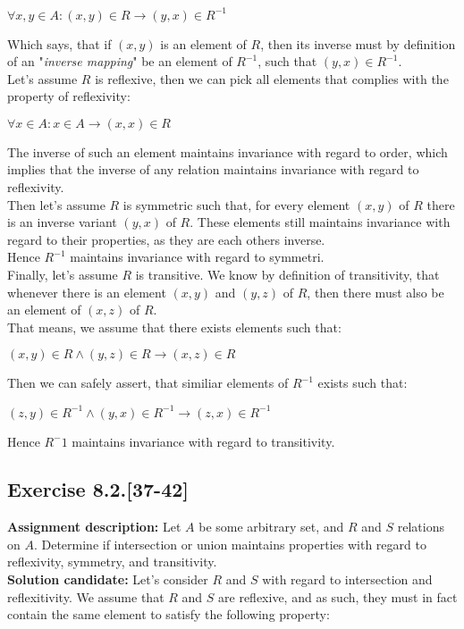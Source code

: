 \documentclass{report}
\newcommand{\cent}[1]{\begin{center}#1\end{center}}
\newcommand{\In}{\! \in \!}
\newcommand{\AssignmentDescription}{\textbf{Assignment description: }}
\newcommand{\Solution}{\textbf{Solution candidate: }}
\newcommand{\Exercise}[1]{\subsection{Exercise #1}}
\begin{document}
	\cent{$\forall x,y \In A : (x,y) \In R \to (y,x) \In R^{-1}$}
	
	Which says, that if  $(x,y)$ is an element of $R$, then its inverse must by definition of an "\textit{inverse mapping}" be an element of $R^{-1}$, such that $(y,x) \In R^{-1}$.\\
	
	Let's assume $R$ is reflexive, then we can pick all elements that complies with the property of reflexivity:
	
	\cent{$\forall x \In A : x \In A \to (x,x) \In R$}
	
	The inverse of such an element maintains invariance with regard to order, which implies that the inverse of any relation maintains invariance with regard to reflexivity.\\
	
	Then let's assume $R$ is symmetric such that, for every element $ (x,y) $ of $R$  there is an inverse variant $ (y,x) $ of $R$. These elements still maintains invariance with regard to their properties, as they are each others inverse.\\ 
	
	Hence $R^{-1}$ maintains invariance with regard to symmetri.\\
	
	Finally, let's assume $R$ is transitive. We know by definition of transitivity, that whenever there is an element $(x,y)$ and $ (y,z) $ of $R$, then there must also be an element of $(x,z)$ of $R$.\\
	
	That means, we assume that there exists elements such that:
	
	\cent{$ (x,y) \In R \wedge (y,z) \In R \to (x,z)\In R$}
	
	Then we can safely assert, that similiar elements of  $R^{-1}$ exists such that:
	
	\cent{$ (z,y) \In R^{-1} \wedge (y,x) \In R^{-1} \to (z,x)\In R^{-1}$}
	
	Hence $R^-1$ maintains invariance with regard to transitivity.
	
	\Exercise{8.2.[37-42]}
	
	\AssignmentDescription
	Let $A$ be some arbitrary set, and $R$ and $S$ relations on $A$. Determine if intersection or union maintains properties with regard to reflexivity, symmetry, and transitivity.\\
	
	\Solution
	Let's consider $R$ and $S$ with regard to intersection and reflexitivity. We assume that $R$ and $S$ are reflexive, and as such, they must in fact contain the same element to satisfy the following property:
	
\end{document}
